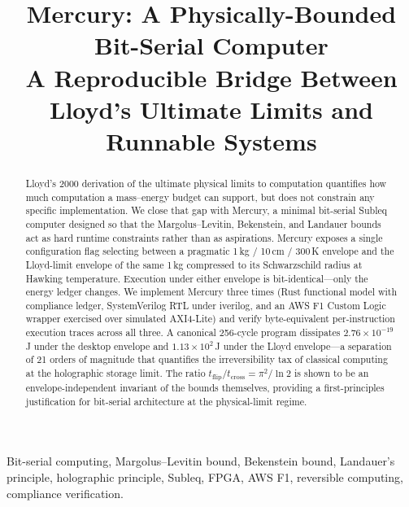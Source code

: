\documentclass[conference,letterpaper,10pt]{IEEEtran}
\begin{document}
\title{Mercury: A Physically-Bounded Bit-Serial Computer\\
\large{A Reproducible Bridge Between Lloyd's Ultimate Limits and Runnable Systems}}

\author{
}

\maketitle

\begin{abstract}
Lloyd's 2000 derivation of the ultimate physical limits to computation
quantifies how much computation a mass--energy budget can support, but
does not constrain any specific implementation. We close that gap with
Mercury, a minimal bit-serial Subleq computer designed so that the
Margolus--Levitin, Bekenstein, and Landauer bounds act as hard runtime
constraints rather than as aspirations. Mercury exposes a single
configuration flag selecting between a pragmatic 1\,kg / 10\,cm /
300\,K envelope and the Lloyd-limit envelope of the same 1\,kg
compressed to its Schwarzschild radius at Hawking temperature.
Execution under either envelope is bit-identical---only the energy
ledger changes. We implement Mercury three times (Rust functional
model with compliance ledger, SystemVerilog RTL under iverilog, and
an AWS F1 Custom Logic wrapper exercised over simulated AXI4-Lite)
and verify byte-equivalent per-instruction execution traces across
all three. A canonical 256-cycle program dissipates
$2.76\times10^{-19}$\,J under the desktop envelope and
$1.13\times10^{2}$\,J under the Lloyd envelope---a separation of
21 orders of magnitude that quantifies the irreversibility tax of
classical computing at the holographic storage limit. The
ratio $t_{\mathrm{flip}}/t_{\mathrm{cross}} = \pi^2/\ln 2$ is shown
to be an envelope-independent invariant of the bounds themselves,
providing a first-principles justification for bit-serial
architecture at the physical-limit regime.
\end{abstract}

\begin{IEEEkeywords}
Bit-serial computing, Margolus--Levitin bound, Bekenstein bound,
Landauer's principle, holographic principle, Subleq, FPGA, AWS F1,
reversible computing, compliance verification.
\end{IEEEkeywords}
\end{document}
